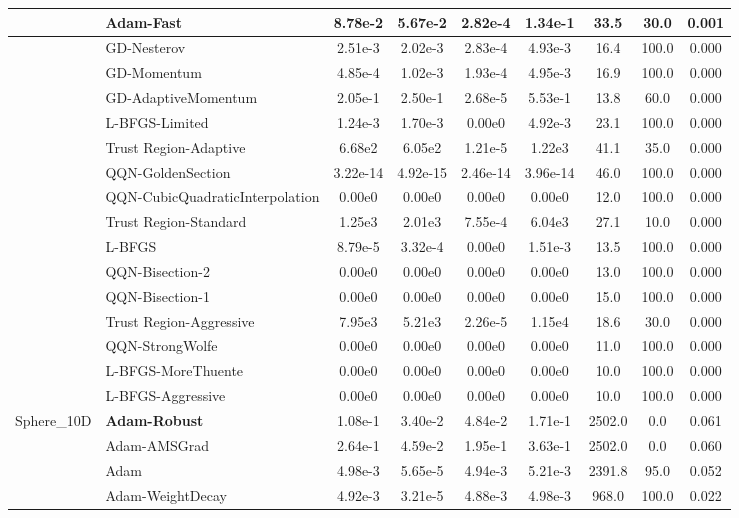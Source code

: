 \documentclass[10pt]{article}
\begin{document}
\begin{longtable}{|l|l|c|c|c|c|c|c|c|}
\hline
 & Adam-Fast & 8.78e-2 & 5.67e-2 & 2.82e-4 & 1.34e-1 & 33.5 & 30.0 & 0.001 \\
\hline
 & GD-Nesterov & 2.51e-3 & 2.02e-3 & 2.83e-4 & 4.93e-3 & 16.4 & 100.0 & 0.000 \\
\hline
 & GD-Momentum & 4.85e-4 & 1.02e-3 & 1.93e-4 & 4.95e-3 & 16.9 & 100.0 & 0.000 \\
\hline
 & GD-AdaptiveMomentum & 2.05e-1 & 2.50e-1 & 2.68e-5 & 5.53e-1 & 13.8 & 60.0 & 0.000 \\
\hline
 & L-BFGS-Limited & 1.24e-3 & 1.70e-3 & 0.00e0 & 4.92e-3 & 23.1 & 100.0 & 0.000 \\
\hline
 & Trust Region-Adaptive & 6.68e2 & 6.05e2 & 1.21e-5 & 1.22e3 & 41.1 & 35.0 & 0.000 \\
\hline
 & QQN-GoldenSection & 3.22e-14 & 4.92e-15 & 2.46e-14 & 3.96e-14 & 46.0 & 100.0 & 0.000 \\
\hline
 & QQN-CubicQuadraticInterpolation & 0.00e0 & 0.00e0 & 0.00e0 & 0.00e0 & 12.0 & 100.0 & 0.000 \\
\hline
 & Trust Region-Standard & 1.25e3 & 2.01e3 & 7.55e-4 & 6.04e3 & 27.1 & 10.0 & 0.000 \\
\hline
 & L-BFGS & 8.79e-5 & 3.32e-4 & 0.00e0 & 1.51e-3 & 13.5 & 100.0 & 0.000 \\
\hline
 & QQN-Bisection-2 & 0.00e0 & 0.00e0 & 0.00e0 & 0.00e0 & 13.0 & 100.0 & 0.000 \\
\hline
 & QQN-Bisection-1 & 0.00e0 & 0.00e0 & 0.00e0 & 0.00e0 & 15.0 & 100.0 & 0.000 \\
\hline
 & Trust Region-Aggressive & 7.95e3 & 5.21e3 & 2.26e-5 & 1.15e4 & 18.6 & 30.0 & 0.000 \\
\hline
 & QQN-StrongWolfe & 0.00e0 & 0.00e0 & 0.00e0 & 0.00e0 & 11.0 & 100.0 & 0.000 \\
\hline
 & L-BFGS-MoreThuente & 0.00e0 & 0.00e0 & 0.00e0 & 0.00e0 & 10.0 & 100.0 & 0.000 \\
\hline
 & L-BFGS-Aggressive & 0.00e0 & 0.00e0 & 0.00e0 & 0.00e0 & 10.0 & 100.0 & 0.000 \\
Sphere\_10D & \textbf{Adam-Robust} & 1.08e-1 & 3.40e-2 & 4.84e-2 & 1.71e-1 & 2502.0 & 0.0 & 0.061 \\
\hline
 & Adam-AMSGrad & 2.64e-1 & 4.59e-2 & 1.95e-1 & 3.63e-1 & 2502.0 & 0.0 & 0.060 \\
\hline
 & Adam & 4.98e-3 & 5.65e-5 & 4.94e-3 & 5.21e-3 & 2391.8 & 95.0 & 0.052 \\
\hline
 & Adam-WeightDecay & 4.92e-3 & 3.21e-5 & 4.88e-3 & 4.98e-3 & 968.0 & 100.0 & 0.022 \\

\end{longtable}
\end{document}
